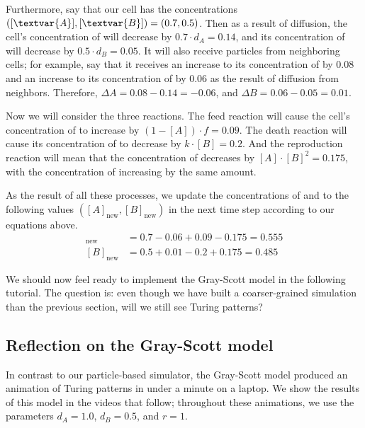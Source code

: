 Furthermore, say that our cell has the concentrations $([\textvar{A}], [\textvar{B}]) = (0.7, 0.5)$. Then as a result of diffusion, the cell's concentration of  will decrease by $0.7 \cdot d_A = 0.14$, and its concentration of  will decrease by $0.5 \cdot d_B = 0.05$. It will also receive particles from neighboring cells; for example, say that it receives an increase to its concentration of  by 0.08 and an increase to its concentration of  by 0.06 as the result of diffusion from neighbors. Therefore, $\Delta A  = 0.08 - 0.14 = -0.06$, and $\Delta B = 0.06 - 0.05 = 0.01$.

Now we will consider the three reactions. The feed reaction will cause the cell's concentration of  to increase by $(1 - [A]) \cdot f = 0.09$. The death reaction will cause its concentration of  to decrease by $k \cdot [B] = 0.2$. And the reproduction reaction will mean that the concentration of  decreases by $[A] \cdot [B]^2 = 0.175$, with the concentration of  increasing by the same amount.

As the result of all these processes, we update the concentrations of  and  to the following values $([A]_{\text{new}}, [B]_{\text{new}})$ in the next time step according to our equations above.
\begin{align*}
[A]_{\text{new}} & = 0.7 - 0.06 + 0.09 - 0.175 = 0.555\\
[B]_{\text{new}} & = 0.5 + 0.01 - 0.2 + 0.175 = 0.485
\end{align*}

We should now feel ready to implement the Gray-Scott model in the following tutorial. The question is: even though we have built a coarser-grained simulation than the previous section, will we still see Turing patterns?


\FloatBarrier
{}
\subsection{Reflection on the Gray-Scott model}

In contrast to our particle-based simulator, the Gray-Scott model produced an animation of Turing patterns in under a minute on a laptop. We show the results of this model in the videos that follow; throughout these animations, we use the parameters $d_A = 1.0$, $d_B = 0.5$, and $r = 1$.

